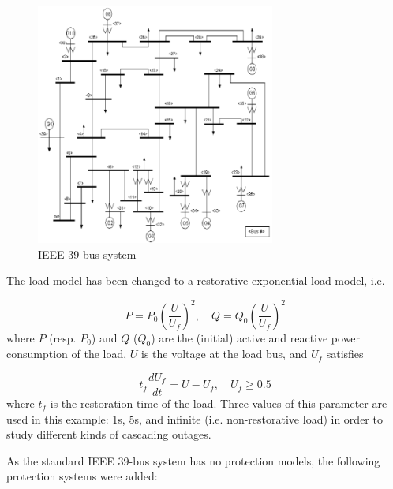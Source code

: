 \begin{figure}
    \centering
    \includegraphics[width=0.7\textwidth]{Figs/IEEE39.png}
    \caption{IEEE 39 bus system~\cite{IEEE39figure}}
    \label{fig:IEEE39}
\end{figure}

The load model has been changed to a restorative exponential load model, i.e.

\begin{equation}
\label{eq:restorative_load_model_1}
P = P_0 \left(\frac{U}{U_f}\right)^2, \quad Q = Q_0 \left(\frac{U}{U_f}\right)^2
\end{equation}
\noindent where \(P\) (resp. \(P_0\)) and \(Q\) (\(Q_0\)) are the (initial) active and reactive power consumption of the load, \(U\) is the voltage at the load bus, and \(U_f\) satisfies

\begin{equation}
\label{eq:restorative_load_model_2}
t_f \frac{dU_f}{dt} = U - U_f, \quad U_f \ge 0.5
\end{equation}
\noindent where \(t_f\) is the restoration time of the load. Three values of this parameter are used in this example: 1s, 5s, and infinite (i.e. non-restorative load) in order to study different kinds of cascading outages.

As the standard IEEE 39-bus system has no protection models, the following protection systems were added:

